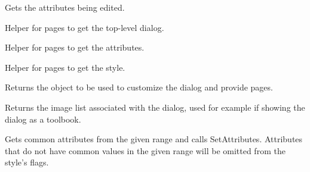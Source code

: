 

Gets the attributes being edited.

\label{wxrichtextformattingdialoggetdialog}


Helper for pages to get the top-level dialog.

\label{wxrichtextformattingdialoggetdialogattributes}


Helper for pages to get the attributes.

\label{wxrichtextformattingdialoggetdialogstyledefinition}


Helper for pages to get the style.

\label{wxrichtextformattingdialoggetformattingdialogfactory}


Returns the object to be used to customize the dialog and provide pages.

\label{wxrichtextformattingdialoggetimagelist}


Returns the image list associated with the dialog, used for example if showing the dialog as a toolbook.

\label{wxrichtextformattingdialoggetstyle}


Gets common attributes from the given range and calls SetAttributes. Attributes that do not have common values in the given range
will be omitted from the style's flags.

\label{wxrichtextformattingdialoggetstyledefinition}

